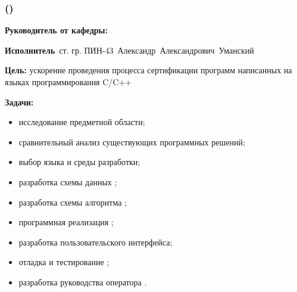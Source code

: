 \begin{frame}
    \frametitle{\textbf{\thesisTitle \textcolor{black}{({\ProgModule})}} }
\textbf{Руководитель от кафедры:}~\supervisorRegaliaShort~\supervisorFioShort

\textbf{Исполнитель}~ст. гр. ПИН-43~Александр~Александрович~Уманский

\textbf{Цель:} ускорение проведения процесса сертификации программ написанных на языках программирования C/C++

\textbf{Задачи:}
\begin{itemize}
    \item исследование предметной области;
    \item сравнительный анализ существующих программных решений;
    \item выбор языка и среды разработки;
    \item разработка схемы данных {\ProgModule};
    \item разработка схемы алгоритма {\ProgModule};
    \item программная реализация {\ProgModule};
    \item разработка пользовательского интерфейса;
    \item отладка и тестирование {\ProgModule};
    \item разработка руководства оператора {\ProgModule}.
\end{itemize}
\end{frame}
